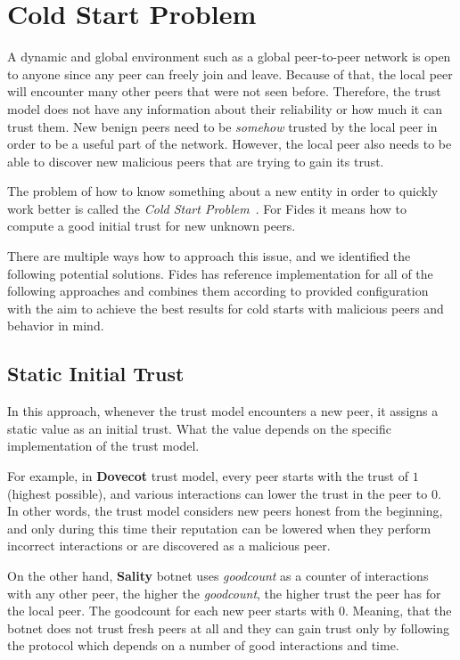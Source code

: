 \section{Cold Start Problem}
\label{sec:cold-start-problem}
A dynamic and global environment such as a global peer-to-peer network is open to anyone since any peer can freely join and leave. Because of that, the local peer will encounter many other peers that were not seen before. Therefore, the trust model does not have any information about their reliability or how much it can trust them. 
New benign peers need to be \textit{somehow} trusted by the local peer in order to be a useful part of the network. However, the local peer also needs to be able to discover new malicious peers that are trying to gain its trust.

The problem of how to know something about a new entity in order to quickly work better is called the \textit{Cold Start Problem}~\cite{christensen2014hybrid}. For Fides it means how to compute a good initial trust for new unknown peers. 

There are multiple ways how to approach this issue, and we identified the following potential solutions. 
Fides has reference implementation for all of the following approaches and combines them according to provided configuration with the aim to achieve the best results for cold starts with malicious peers and behavior in mind.

\subsection{Static Initial Trust}
\label{subsec:static-initial-trust}
In this approach, whenever the trust model encounters a new peer, it assigns a static value as an initial trust. What the value depends on the specific implementation of the trust model.

For example, in \textbf{Dovecot} trust model, every peer starts with the trust of $1$ (highest possible), and various interactions can lower the trust in the peer to $0$. In other words, the trust model considers new peers honest from the beginning, and only during this time their reputation can be lowered when they perform incorrect interactions or are discovered as a malicious peer.

On the other hand, \textbf{Sality} botnet uses \textit{goodcount} as a counter of interactions with any other peer, the higher the \textit{goodcount}, the higher trust the peer has for the local peer. The goodcount for each new peer starts with $0$. Meaning, that the botnet does not trust fresh peers at all and they can gain trust only by following the protocol which depends on a number of good interactions and time.

